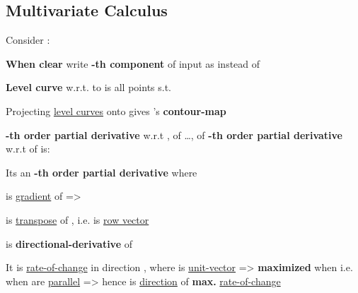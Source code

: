 \subsection*{Multivariate Calculus}


Consider :

\begin{itemize}
      \vItem \textbf{When clear} write \textbf{-th component} of input as
             instead of 

      \vItem \textbf{Level curve} w.r.t. to  is all points
            s.t. 

      \vItem
            Projecting \ul{level curves} onto  gives 's \textbf{contour-map}
\end{itemize}

\hSep %

\textbf{-th order partial derivative} w.r.t
, of \ldots, of \textbf{-th order partial derivative}
w.r.t  of  is:

\begin{itemize}

      \vItem
      \vItem
            Its an \textbf{-th order partial derivative} where 

      \vItem {}
            is \ul{gradient} of \iMbox{f} => 

      \vItem {} is \ul{transpose} of , i.e.  is \ul{row vector}
\end{itemize}

\hSep %

is \textbf{directional-derivative} of \iMbox{f}
\begin{itemize}

      \vItem
            It is \ul{rate-of-change} in direction , where  is \ul{unit-vector}
      \vItem
            => \iMbox{D_{\mathbf{u}}f(\mathbf{x})} \textbf{maximized} when \iMbox{\cos\theta = 1}
      \vItem
            i.e. when  are \ul{parallel} => hence  is
            \ul{direction} of \textbf{max.} \ul{rate-of-change}
\end{itemize}

